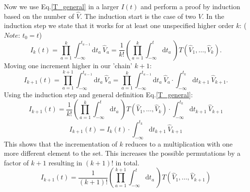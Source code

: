 \documentclass[12pt, titlepage]{article}
\begin{document}
\begin{subappendices}
Now we use Eq.\enskip\eqref{T_general} in a larger $ I(t) $ and perform a proof by induction based on the number of $ \hat{V} $. The induction start is the case of two $ \hat{V} $. In the induction step we state that it works for at least one unspecified higher order $ k $: ($ \textit{Note:} $ $ t_0 = t $)\\
\begin{equation}
I_k (t)
=
 \prod_{a=1}^{k} 
 \int_{-\infty}^{t_{a-1}}\mathrm{d}t_a\
  \hat{V}_a
=
\dfrac{1}{k!}
 (
 \prod_{a=1}^{k} 
\int_{-\infty}^{t}\mathrm{d}t_a\
)
T(\hat{V}_1,\ldots,\hat{V}_k).
\end{equation}
Moving one increment higher in our 'chain' $ k+1 $:
\begin{equation}
I_{k+1} (t)
=
 \prod_{a=1}^{k+1} 
 \int_{-\infty}^{t_{a-1}}\mathrm{d}t_a\
  \hat{V}_a
  =
   \prod_{a=1}^{k} 
 \int_{-\infty}^{t_{a-1}}\mathrm{d}t_a\
  \hat{V}_a
  \cdot
 \int_{-\infty}^{t_{k}}\mathrm{d}t_{k+1}\
 \hat{V}_{k+1}.
\end{equation}
Using the induction step and general definition Eq.\enskip\eqref{T_general}:
\begin{equation}
I_{k+1} (t)
=
\dfrac{1}{k!}
 (
 \prod_{a=1}^{k} 
\int_{-\infty}^{t}\mathrm{d}t_a\
)
T(\hat{V}_1,\ldots,\hat{V}_k)
\cdot
 \int_{-\infty}^{t_{k}}\mathrm{d}t_{k+1}\
 \hat{V}_{k+1}
\end{equation}
\begin{equation}
I_{k+1} (t)
=
I_k (t)
\cdot
 \int_{-\infty}^{t_{k}}\mathrm{d}t_{k+1}\
 \hat{V}_{k+1}
\end{equation}
This shows that the incrementation of $ k $ reduces to a multiplication with one more different element to the set. This increases the possible permutations by a factor of $ k+1 $ resulting in $ (k+1)! $ in total.
\begin{equation}
I_{k+1}(t)
=
\dfrac{1}{(k+1)!}
 (
 \prod_{a=1}^{k+1} 
\int_{-\infty}^{t}\mathrm{d}t_a\
)
T(\hat{V}_1,\ldots,\hat{V}_{k+1})
\end{equation}


\end{subappendices}
\end{document}
